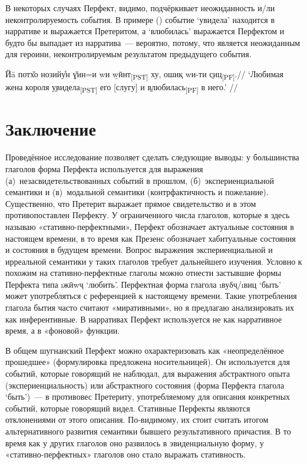 {{{В некоторых случаях Перфект, видимо, подчёркивает неожиданность и/ли неконтролируемость события. В примере () событие ‘увидела’ находится в нарративе и выражается Претеритом, а ‘влюбилась’ выражается Перфектом и будто бы выпадает из нарратива~— вероятно, потому, что является неожиданным для героини, неконтролируемым результатом предыдущего события.

\begingl
\gla Йā потх̌о нозийу̊н ɣ̌ин=и wи \b{wӣнт}\textsubscript{[PST]} ху, ошиқ wи-ти \b{сиц}\textsubscript{[PF]}.//
\glft ‘Любимая жена короля \b{увидела}\textsubscript{[PST]} его [слугу] и \b{влюбилась}\textsubscript{[PF]} в него.’ //
\endgl \xe

\pagebreak[2]

\section{Заключение} \label{evid-conclusion}

Проведённое исследование позволяет сделать следующие выводы: у большинства глаголов форма Перфекта используется для выражения (а)~незасвидетельствованных событий в прошлом, (б)~экспериенциальной семантики и (в)~модальной семантики (контрфактичность и пожелание). Существенно, что Претерит выражает прямое свидетельство и в этом противопоставлен Перфекту. У ограниченного числа глаголов, которые я здесь называю «стативно-перфектными», Перфект обозначает актуальные состояния в настоящем времени, в то время как Презенс обозначает хабитуальные состояния и состояния в будущем времени. Вопрос выражения экспериенциальной и ирреальной семантики у таких глаголов требует дальнейшего изучения. Условно к похожим на стативно-перфектные глаголы можно отнести застывшие формы Перфекта типа \i{жӣwҷ} ‘любить’. Перфектная форма глагола \i{вуδҷ}/\i{виц} ‘быть’ может употребляться с референцией к настоящему времени. Такие употребления глагола бытия часто считают «миративными», но я предлагаю анализировать их как инферентивные. В нарративах Перфект используется не как нарративное время, а в «фоновой» функции.

В общем шугнанский Перфект можно охарактеризовать как «неопределённое прошедшее» (формулировка предложена носительницей). Он используется для событий, которые говорящий не наблюдал, для выражения абстрактного опыта (экспериенциальность) или абстрактного состояния (форма Перфекта глагола ‘быть’)~— в противовес Претериту, употребляемому для описания конкретных событий, которые говорящий видел. Стативные Перфекты являются отклонениями от этого описания. По-видимому, их стоит считать итогом альтернативного развития семантики бывшего результативного причастия. В то время как у других глаголов оно развилось в эвиденциальную форму, у «стативно-перфектных» глаголов оно стало выражать стативность.

}}}
